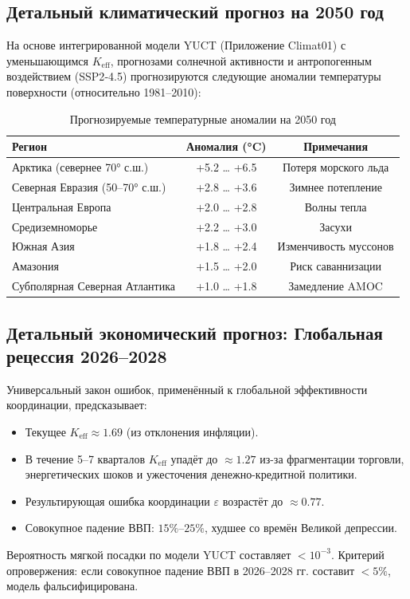 \documentclass[12pt,a4paper]{article}
\newcommand{\Keff}{K_{\mathrm{eff}}}
\begin{document}
	\subsection{Детальный климатический прогноз на 2050 год}
	
	На основе интегрированной модели YUCT (Приложение Climat01) с уменьшающимся $\Keff$,
	прогнозами солнечной активности и антропогенным воздействием (SSP2‑4.5) прогнозируются
	следующие аномалии температуры поверхности (относительно 1981–2010):
	
	\begin{table}[H]
		\centering
		\caption{Прогнозируемые температурные аномалии на 2050 год}
		\begin{tabular}{lcc}
			\toprule
			Регион & Аномалия (°C) & Примечания \\
			\midrule
			Арктика (севернее 70° с.ш.) & +5.2 … +6.5 & Потеря морского льда \\
			Северная Евразия (50–70° с.ш.) & +2.8 … +3.6 & Зимнее потепление \\
			Центральная Европа & +2.0 … +2.8 & Волны тепла \\
			Средиземноморье & +2.2 … +3.0 & Засухи \\
			Южная Азия & +1.8 … +2.4 & Изменчивость муссонов \\
			Амазония & +1.5 … +2.0 & Риск саваннизации \\
			Субполярная Северная Атлантика & +1.0 … +1.8 & Замедление AMOC \\
			\bottomrule
		\end{tabular}
	\end{table}
	
	\subsection{Детальный экономический прогноз: Глобальная рецессия 2026–2028}
	
	Универсальный закон ошибок, применённый к глобальной эффективности координации, предсказывает:
	\begin{itemize}
		\item Текущее $\Keff \approx 1.69$ (из отклонения инфляции).
		\item В течение 5–7 кварталов $\Keff$ упадёт до $\approx 1.27$ из-за фрагментации торговли,
		энергетических шоков и ужесточения денежно-кредитной политики.
		\item Результирующая ошибка координации $\varepsilon$ возрастёт до $\approx 0.77$.
		\item Совокупное падение ВВП: $15\%$–$25\%$, худшее со времён Великой депрессии.
	\end{itemize}
	Вероятность мягкой посадки по модели YUCT составляет $<10^{-3}$.
	Критерий опровержения: если совокупное падение ВВП в 2026–2028 гг. составит $<5\%$, модель фальсифицирована.
	
\end{document}
